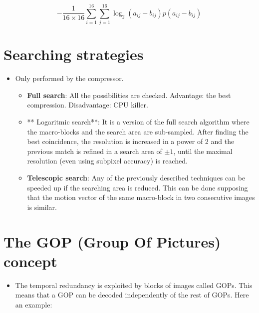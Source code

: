 {\begin{itemize}
\begin{itemize}
    \begin{equation}
      -\frac{1}{16\times 16}\sum_{i=1}^{16}\sum_{j=1}^{16}\log_2(a_{ij}-b_{ij})p(a_{ij}-b_{ij})
    \end{equation}
  \end{itemize}
\end{itemize}

\section{Searching strategies}
\begin{itemize}
\item
  Only performed by the compressor.

  \begin{itemize}
  \tightlist
  \item
    \textbf{Full search}: All the possibilities are checked. Advantage:
    the best compression. Disadvantage: CPU killer.
  \end{itemize}

  
  \begin{itemize}
  \tightlist
  \item
    ** Logaritmic search**: It is a version of the full search algorithm
    where the macro-blocks and the search area are sub-sampled. After
    finding the best coincidence, the resolution is increased in a power
    of 2 and the previous match is refined in a search area of
    $\pm 1$, until the maximal resolution (even using subpixel
    accuracy) is reached.
  \end{itemize}

  \begin{itemize}
  \tightlist
  \item
    \textbf{Telescopic search}: Any of the previously described
    techniques can be speeded up if the searching area is reduced. This
    can be done supposing that the motion vector of the same macro-block
    in two consecutive images is similar.
  \end{itemize}
\end{itemize}

\section{The GOP (Group Of Pictures) concept}
\begin{itemize}
\tightlist
\item
  The temporal redundancy is exploited by blocks of images called GOPs.
  This means that a GOP can be decoded independently of the rest of
  GOPs. Here an example:
\end{itemize}

}
